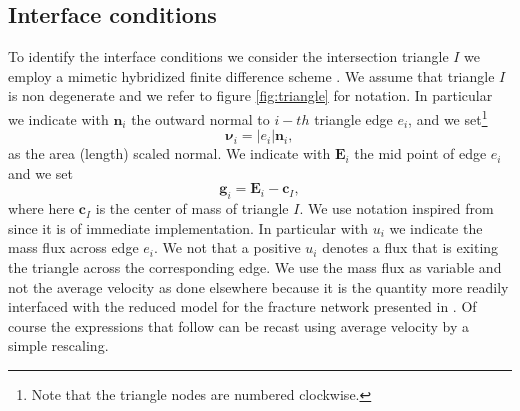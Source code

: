 \documentclass[11pt,a4paper,twoside]{article}
\newcommand{\centerpoint}{\ensuremath{\boldsymbol{c}}}
\newcommand{\edge}{\ensuremath{e}}
\newcommand{\flux}{\ensuremath{u}}
\newcommand{\normal}{\ensuremath{\boldsymbol{n}}}
\newcommand{\normalarea}{\ensuremath{\boldsymbol{\nu}}}
\newcommand{\cvect}{\ensuremath{\boldsymbol{g}}}
\newcommand{\centeredge}{\ensuremath{\boldsymbol{E}}}
\begin{document}
\subsection{Interface conditions}
To identify the interface conditions we consider the intersection
triangle $I$ we employ a mimetic hybridized finite difference scheme
\cite{lie2012open,brezzi2005family}.  We assume that triangle $I$ is
non degenerate and we refer to figure \ref{fig:triangle} for
notation. In particular we indicate with $\normal_i$ the outward
normal to $i-th$ triangle edge $\edge_i$, and we set\footnote{Note that the
  triangle nodes are numbered clockwise.}
\begin{equation}
\label{eq:normalarea}
\normalarea_i=|\edge_i|\normal_i,
\end{equation}
as the area (length) scaled normal. We indicate with $\centeredge_i$ the mid point of edge $\edge_i$ and we set
\begin{equation}
\label{eq:cvect}
\cvect_i=\centeredge_i-\centerpoint_I,
\end{equation} 
where here $\centerpoint_I$ is the center of mass of triangle $I$.  We
use notation inspired from \cite{lie2012open} since it is of immediate
implementation. In particular with $\flux_i$ we indicate the mass flux
across edge $\edge_i$. We not that a positive $\flux_i$ denotes a flux
that is exiting the triangle across the corresponding edge. We use the
mass flux as variable and not the average velocity as done elsewhere
because it is the quantity more readily interfaced with the reduced
model for the fracture network presented in \cite{Formaggia2014}. Of
course the expressions that follow can be recast using average
velocity by a simple rescaling.
\end{document}
